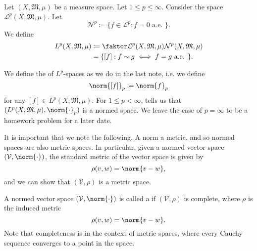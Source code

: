 \documentclass[notoc,notitlepage]{tufte-book}
\begin{document}
\begin{defn}[$L^p$-spaces]\label{defn:_l_p_spaces}
  Let $(X, \mathfrak{M}, \mu)$ be a measure space.
  Let $1 \leq p \leq \infty$.
  Consider the space $\mathcal{L}^p(X, \mathfrak{M}, \mu)$.
  Let
  \begin{equation*}
    \mathcal{N}^p \coloneqq \{ f \in \mathcal{L}^p : f = 0 \text{ a.e. } \}.
  \end{equation*}
  We define
  \begin{align*}
    L^p(X, \mathfrak{M}, \mu) 
    &\coloneqq \quotient{\mathcal{L}^p(X, \mathfrak{M}, \mu)}
        {\mathcal{N}^p(X, \mathfrak{M}, \mu)} \\
    &= \{ [f] : f \sim g \iff f = g \text{ a.e. } \}.
  \end{align*}
\end{defn}

\begin{note}
  We define the  of $L^p$-spaces 
  as we do in the last note, i.e. we define
  \begin{equation*}
    \norm{[f]}_p \coloneqq \norm{f}_p
  \end{equation*}
  for any $[f] \in L^p(X, \mathfrak{M}, \mu)$.
  For $1 \leq p < \infty$, 
  tells us that $(L^p(X, \mathfrak{M}, \mu), \norm{\cdot}_p)$ is a normed space.
  We leave the case of $p = \infty$ to be a homework problem for a later date.
\end{note}

\begin{remark}
  It is important that we note the following.
  A norm  a metric,
  and so normed spaces are also metric spaces.
  In particular, given a normed vector space $(\mathcal{V}, \norm{\cdot})$,
  the standard metric of the vector space is given by
  \begin{equation*}
    \rho(v, w) = \norm{v - w},
  \end{equation*}
  and we can show that $(\mathcal{V}, \rho)$ is a metric space.
\end{remark}

\begin{defn}\label{defn:banach_space}
  A normed vector space $(\mathcal{V}, \norm{\cdot})$ is called a
   if $(\mathcal{V}, \rho)$ is complete,
  where $\rho$ is the induced metric
  \begin{equation*}
    \rho(v, w) = \norm{v - w}.
  \end{equation*}
  Note that completeness is in the context of metric spaces,
  where every Cauchy sequence converges to a point in the space.
\end{defn}
\end{document}

